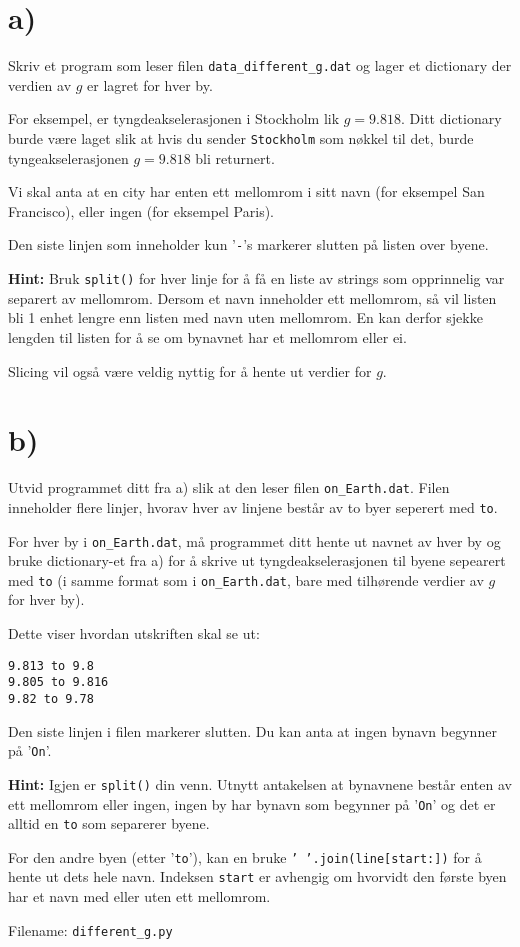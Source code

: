\documentclass[10pt,a4paper]{article}
\begin{document}
\section*{a)}
Skriv et program som leser filen \texttt{data\_different\_g.dat} og lager et dictionary der verdien av $g$ er lagret for hver by. 

For eksempel, er tyngdeakselerasjonen i Stockholm lik $g = 9.818$. Ditt dictionary burde være laget slik at hvis du sender \texttt{Stockholm} som nøkkel til det, burde tyngeakselerasjonen $ g = 9.818$ bli returnert. 

Vi skal anta at en city har enten ett mellomrom i sitt navn (for eksempel San Francisco), eller ingen (for eksempel Paris).

Den siste linjen som inneholder kun '\texttt{-}'s markerer slutten på listen over byene. 

\textbf{Hint: } Bruk \texttt{split()} for hver linje for å få en liste av strings som opprinnelig var separert av mellomrom. Dersom et navn inneholder ett mellomrom, så vil listen bli 1 enhet lengre enn listen med navn uten mellomrom. En kan derfor sjekke lengden til listen for å se om bynavnet har et mellomrom eller ei.  

Slicing vil også være veldig nyttig for å hente ut verdier for $g$. 
\section*{b)}
Utvid programmet ditt fra a) slik at den leser filen \texttt{on\_Earth.dat}. 
Filen inneholder flere linjer, hvorav hver av linjene består av to byer seperert med \texttt{to}. 

For hver by i \texttt{on\_Earth.dat}, må programmet ditt hente ut navnet av hver by og bruke dictionary-et fra a) for å skrive ut tyngdeakselerasjonen til byene sepearert med \texttt{to} (i samme format som i \texttt{on\_Earth.dat}, bare med tilhørende verdier av $g$ for hver by). 

Dette viser hvordan utskriften skal se ut:
\begin{verbatim}
9.813 to 9.8
9.805 to 9.816
9.82 to 9.78
\end{verbatim}

Den siste linjen i filen markerer slutten. Du kan anta at ingen bynavn begynner på '\texttt{On}'. 

\textbf{Hint: } Igjen er \texttt{split()} din venn. Utnytt antakelsen at bynavnene består enten av ett mellomrom eller ingen, ingen by har bynavn som begynner på '\texttt{On}' og det er alltid en \texttt{to} som separerer byene. 

For den andre byen (etter '\texttt{to}'), kan en bruke  \texttt{' '.join(line[start:])} for å hente ut dets hele navn. Indeksen \texttt{start} er avhengig om hvorvidt den første byen har et navn med eller uten ett mellomrom. 

Filename: \texttt{different\_g.py}
 
\end{document}
